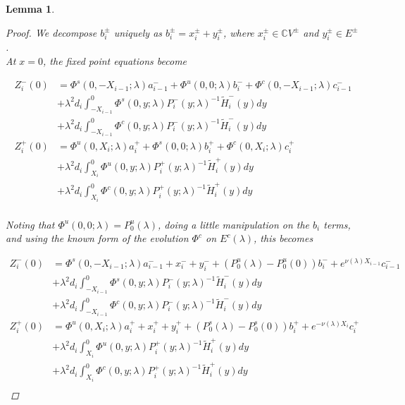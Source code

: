 \documentclass[12pt]{article}
\def\C{{\mathbb C}}
\newtheorem{lemma}{Lemma}
\begin{document}
\begin{lemma}
\begin{proof}
We decompose $b_i^\pm$ uniquely as $b_i^\pm = x_i^\pm + y_i^\pm$, where $x_i^\pm \in \C V^\pm$ and $y_i^\pm \in E^\pm$.\\

At $x = 0$, the fixed point equations become

\begin{align*}
Z_i^-(0) &= \Phi^s(0, -X_{i-1}; \lambda) a_{i-1}^- + \Phi^u(0, 0; \lambda) b_i^- + \Phi^c(0, -X_{i-1}; \lambda) c_{i-1}^- \\
&+ \lambda^2 d_i \int_{-X_{i-1}}^0 \Phi^s(0, y; \lambda) P_i^-(y; \lambda)^{-1} \tilde{H}_i^-(y) dy \\
&+ \lambda^2 d_i \int_{-X_{i-1}}^0 \Phi^c(0, y; \lambda) P_i^-(y; \lambda)^{-1} \tilde{H}_i^-(y) dy  \\ 
Z_i^+(0) &= \Phi^u(0, X_i; \lambda) a_i^+ + \Phi^s(0, 0; \lambda) b_i^+ + \Phi^c(0, X_i; \lambda) c_i^+ \\
&+ \lambda^2 d_i \int_{X_i}^0 \Phi^u(0, y; \lambda) P_i^+(y; \lambda)^{-1} \tilde{H}_i^+(y) dy \\
&+ \lambda^2 d_i \int_{X_i}^0 \Phi^c(0, y; \lambda) P_i^+(y; \lambda)^{-1} \tilde{H}_i^+(y) dy \\
\end{align*}

Noting that $\Phi^u(0, 0; \lambda) = P_0^u(\lambda)$, doing a little manipulation on the $b_i$ terms, and using the known form of the evolution $\Phi^c$ on $E^c(\lambda)$, this becomes

\begin{align*}
Z_i^-(0) &= \Phi^s(0, -X_{i-1}; \lambda) a_{i-1}^- + x_i^- + y_i^- + (P_0^u(\lambda) - P_0^u(0))b_i^- + e^{\nu(\lambda) X_{i-1}} c_{i-1}^- \\
&+ \lambda^2 d_i \int_{-X_{i-1}}^0 \Phi^s(0, y; \lambda) P_i^-(y; \lambda)^{-1} \tilde{H}_i^-(y) dy \\
&+ \lambda^2 d_i \int_{-X_{i-1}}^0 \Phi^c(0, y; \lambda) P_i^-(y; \lambda)^{-1} \tilde{H}_i^-(y) dy  \\ 
Z_i^+(0) &= \Phi^u(0, X_i; \lambda) a_i^+ + x_i^+ + y_i^+ + (P_0^s(\lambda) - P_0^s(0)) b_i^+ + e^{-\nu(\lambda)X_i} c_i^+ \\
&+ \lambda^2 d_i \int_{X_i}^0 \Phi^u(0, y; \lambda) P_i^+(y; \lambda)^{-1} \tilde{H}_i^+(y) dy \\
&+ \lambda^2 d_i \int_{X_i}^0 \Phi^c(0, y; \lambda) P_i^+(y; \lambda)^{-1} \tilde{H}_i^+(y) dy \\
\end{align*}


\end{proof}
\end{lemma}
\end{document}
